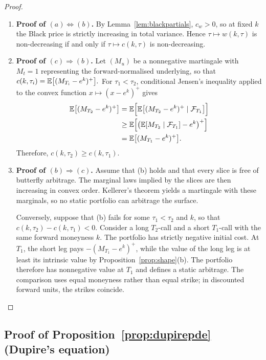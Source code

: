 \begin{proof}
\begin{enumerate}[label=\textup{(\roman*)}, leftmargin=*]

\item \textbf{Proof of $(a)\iff(b)$.}
By Lemma~\ref{lem:blackpartials}, $c_w>0$, so at fixed $k$ the Black price is strictly
increasing in total variance. Hence $\tau\mapsto w(k,\tau)$ is non-decreasing if and only if
$\tau\mapsto c(k,\tau)$ is non-decreasing.

\item \textbf{Proof of $(c)\Rightarrow(b)$.}
Let $(M_u)$ be a nonnegative martingale with $M_t=1$ representing the forward-normalised
underlying, so that
$c(k,\tau_i)=\mathbb{E}\bigl[(M_{T_i}-e^k)^+\bigr].$
For $\tau_1<\tau_2$, conditional Jensen's inequality applied to the convex function
$x\mapsto(x-e^k)^+$ gives
\[
\begin{aligned}
\mathbb{E}\bigl[(M_{T_2}-e^k)^+\bigr]
&=\mathbb{E}\Bigl[\mathbb{E}\bigl[(M_{T_2}-e^k)^+\mid\mathcal F_{T_1}\bigr]\Bigr]\\
&\ge \mathbb{E}\Bigl[\bigl(\mathbb{E}[M_{T_2}\mid\mathcal F_{T_1}]-e^k\bigr)^+\Bigr]\\
&=\mathbb{E}\bigl[(M_{T_1}-e^k)^+\bigr].
\end{aligned}
\]
Therefore, $c(k,\tau_2)\ge c(k,\tau_1)$.

\item \textbf{Proof of $(b)\Rightarrow(c)$.}
Assume that (b) holds and that every slice is free of butterfly arbitrage. The marginal laws
implied by the slices are then increasing in convex order. Kellerer's theorem
\cite{kellerer1972} yields a martingale with these marginals, so no static portfolio can
arbitrage the surface.

Conversely, suppose that (b) fails for some $\tau_1<\tau_2$ and $k$, so that
$c(k,\tau_2)-c(k,\tau_1)<0.$
Consider a long $T_2$-call and a short $T_1$-call with the same forward moneyness $k$. The
portfolio has strictly negative initial cost. At $T_1$, the short leg pays
$-(M_{T_1}-e^k)^+$, while the value of the long leg is at least its intrinsic value by
Proposition~\ref{prop:shape}(b). The portfolio therefore has nonnegative value at $T_1$ and
defines a static arbitrage. The comparison uses equal moneyness rather than equal strike; in
discounted forward units, the strikes coincide.
\end{enumerate}
\end{proof}

\subsection{Proof of Proposition~\ref{prop:dupirepde} (Dupire's equation)}
\label{proof:dupirepde}

